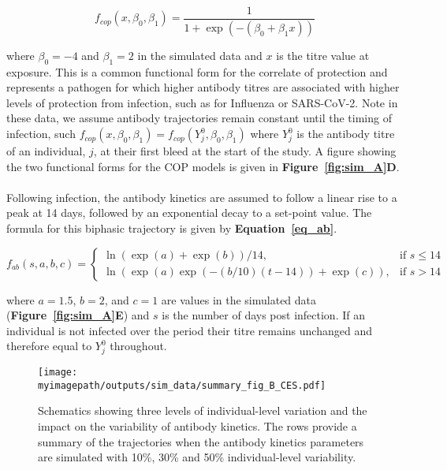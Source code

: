 \begin{equation}
\label{eq_cop}
f_{cop}(x, \beta_0, \beta_1) = \frac{1}{1 + \exp(- (\beta_0 + \beta_1x))}
\end{equation}

where $\beta_0 = -4$ and $\beta_1 = 2$ in the simulated data and $x$ is the titre value at exposure. This is a common functional form for the correlate of protection and represents a pathogen for which higher antibody titres are associated with higher levels of protection from infection, such as for Influenza or SARS-CoV-2.\cite{Dunning2015-bx} Note in these data, we assume antibody trajectories remain constant until the timing of infection, such $f_{cop}(x, \beta_0, \beta_1) = f_{cop}(Y^0_{j}, \beta_0, \beta_1)$ where $Y^0_{j}$ is the antibody titre of an individual, $j$, at their first bleed at the start of the study.  A figure showing the two functional forms for the COP models is given in \textbf{Figure~\ref{fig:sim_A}D}.

\paragraph{}Following infection, the antibody kinetics are assumed to follow a linear rise to a peak at 14 days, followed by an exponential decay to a set-point value.\cite{Srivastava2023-of} The formula for this biphasic trajectory is given by \textbf{Equation~\ref{eq_ab}}.

\begin{equation}
\label{eq_ab}
f_{ab}(s, a, b, c) =
\begin{cases}
  \ln(\exp(a) + \exp(b)) / 14, & \text{if }s \leq 14 \\
  \ln(\exp(a) \exp(-(b/10)(t - 14)) + \exp(c)), &\text{if } s > 14
\end{cases}
\end{equation}

where $a = 1.5$, $b = 2$, and $c = 1$ are values in the simulated data (\textbf{Figure~\ref{fig:sim_A}E}) and $s$ is the number of days post infection. If an individual is not infected over the period their titre remains unchanged and therefore equal to $Y^0_{j}$ throughout. 

\begin{figure}[H]
    \centering
    \texttt{[image: \\myimagepath/outputs/sim\_data/summary\_fig\_B\_CES.pdf]}     \caption{Schematics showing three levels of individual-level variation and the impact on the variability of antibody kinetics. The rows provide a summary of the trajectories when the antibody kinetics parameters are simulated with 10\%, 30\% and 50\% individual-level variability.     \label{fig:sim_B}}

\end{figure}


